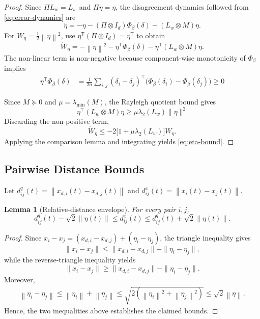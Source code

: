 \documentclass[letterpaper,10pt,conference]{ieeeconf}
\newcommand{\norm}[1]{\left\lVert #1 \right\rVert}
\newcommand{\trans}{^{\mathsf T}}
\newtheorem{lemma}{Lemma}
\begin{document}
\begin{proof}
Since $\Pi L_w=L_w$ and $\Pi\eta=\eta$, the disagreement dynamics followed from \eqref{eq:error-dynamics} are
\begin{equation}
  \dot\eta=-\eta-(\Pi\otimes I_d)\Phi_\beta(\delta)-(L_w\otimes M)\eta.
\end{equation}
For $W_\eta=\frac12\norm{\eta}^2$, use $\eta\trans(\Pi\otimes I_d)=\eta\trans$ to obtain
\begin{equation}
  \dot W_\eta=-\norm{\eta}^2-\eta\trans\Phi_\beta(\delta)
  -\eta\trans(L_w\otimes M)\eta.
\end{equation}
The non-linear term is non-negative because component-wise monotonicity of $\Phi_\beta$ implies
\begin{equation}
\begin{aligned}
  \eta\trans\Phi_\beta(\delta)
  &=\frac{1}{2n}\sum_{i,j}(\delta_i-\delta_j)^\top\big(\Phi_\beta(\delta_i)-\Phi_\beta(\delta_j)\big)\geq0
\end{aligned}
\end{equation}

Since \(M\succeq0\) and \(\mu=\lambda_{\min}(M)\), the Rayleigh quotient bound gives
\[
\eta^\top(L_w\otimes M)\eta
\geq \mu\lambda_2(L_w)\|\eta\|^2
\]
Discarding the non-positive term,
\[
\dot W_\eta
\leq -2\bigl[1+\mu\lambda_2(L_w)\bigr]W_\eta.
\]
Applying the comparison lemma and integrating yields \eqref{eq:eta-bound}.
\end{proof}

\subsection{Pairwise Distance Bounds}
Let $d_{ij}^q(t)=\norm{x_{d,i}(t)-x_{d,j}(t)}$ and $d_{ij}^x(t)=\norm{x_i(t)-x_j(t)}$.

\begin{lemma}[Relative-distance envelope]
\label{lem:distance-tube}
For every pair $i,j$,
\begin{equation}
  d_{ij}^q(t)-\sqrt2\norm{\eta(t)}\leq d_{ij}^x(t)
  \leq d_{ij}^q(t)+\sqrt2\norm{\eta(t)}.
  \label{eq:distance-tube}
\end{equation}
\end{lemma}
\begin{proof}
Since $x_i-x_j=(x_{d,i}-x_{d,j})+(\eta_i-\eta_j)$, the triangle inequality gives
\[
\|x_i-x_j\|
\leq \|x_{d,i}-x_{d,j}\|+\|\eta_i-\eta_j\|,
\]
while the reverse-triangle inequality yields
\[
\|x_i-x_j\|
\geq \|x_{d,i}-x_{d,j}\|-\|\eta_i-\eta_j\|.
\]
Moreover,
\[
\begin{aligned}
\norm{\eta_i-\eta_j} \leq \norm{\eta_i}+\norm{\eta_j} \leq\sqrt{2(\norm{\eta_i}^2+\norm{\eta_j}^2)}\leq\sqrt2\norm{\eta}. 
\end{aligned}
\]
Hence, the two inequalities above
establishes the claimed bounds.
\end{proof}
\end{document}

